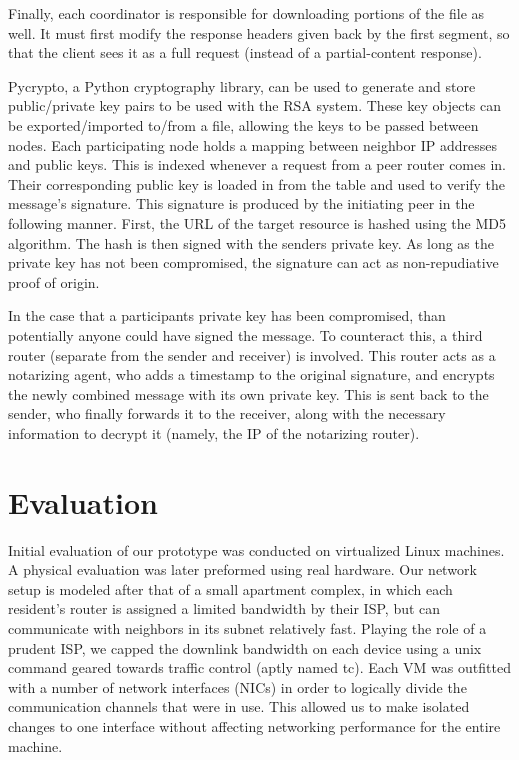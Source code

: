 \documentclass[12pt]{article}
\begin{document}
			Finally, each coordinator is responsible for downloading portions of the file as well. It must first modify the response headers given back by the first segment, so that the client sees it as a full request (instead of a partial-content response).

			Pycrypto, a Python cryptography library, can be used to generate and store public/private key pairs to be used with the RSA system. These key objects can be exported/imported to/from a file, allowing the keys to be passed between nodes. Each participating node holds a mapping between neighbor IP addresses and public keys. This is indexed whenever a request from a peer router comes in. Their corresponding public key is loaded in from the table and used to verify the message's signature. This signature is produced by the initiating peer in the following manner. First, the URL of the target resource is hashed using the MD5 algorithm. The hash is then signed with the senders private key. As long as the private key has not been compromised, the signature can act as non-repudiative proof of origin.

			In the case that a participants private key has been compromised, than potentially anyone could have signed the message. To counteract this, a third router (separate from the sender and receiver) is involved. This router acts as a notarizing agent, who adds a timestamp to the original signature, and encrypts the newly combined message with its own private key. This is sent back to the sender, who finally forwards it to the receiver, along with the necessary information to decrypt it (namely, the IP of the notarizing router).




\newpage
\section{Evaluation}

	Initial evaluation of our prototype was conducted on virtualized Linux machines. A physical evaluation was later preformed using real hardware. Our network setup is modeled after that of a small apartment complex, in which each resident's router is assigned a limited bandwidth by their ISP, but can communicate with neighbors in its subnet relatively fast. Playing the role of a prudent ISP, we capped the downlink bandwidth on each device using a unix command geared towards traffic control (aptly named tc). Each VM was outfitted with a number of network interfaces (NICs) in order to logically divide the communication channels that were in use. This allowed us to make isolated changes to one interface without affecting networking performance for the entire machine. 
\end{document}
